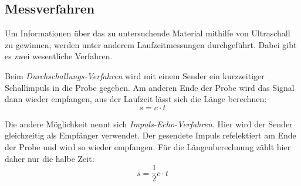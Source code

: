 \subsection{Messverfahren}
\label{sec:Messverfahren}
Um Informationen über das zu untersuchende Material mithilfe von Ultraschall zu gewinnen, werden unter anderem
Laufzeitmessungen durchgeführt. Dabei gibt es zwei wesentliche Verfahren.

Beim \textit{Durchschallungs-Verfahren} wird mit einem Sender ein kurzzeitiger Schallimpuls in die Probe gegeben.
Am anderen Ende der Probe wird das Signal dann wieder empfangen, aus der Laufzeit lässt sich die Länge berechnen:
\begin{equation}
    \label{eq:Durchschall}
    s=c\cdot t
\end{equation}

Die andere Möglichkeit nennt sich \textit{Impuls-Echo-Verfahren}. Hier wird der Sender gleichzeitig als Empfänger verwendet.
Der gesendete Impuls refelektiert am Ende der Probe und wird so wieder empfangen.
Für die Längenberechnung zählt hier daher nur die halbe Zeit:
\begin{equation}
    \label{eq:Impuls-Echo}
    s=\frac{1}{2} c\cdot t
\end{equation}